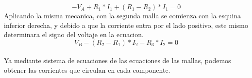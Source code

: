 \begin {equation*}
    -V_A + R_1 * I_1 + (R_1-R_2) * I_1 = 0
\end {equation*}
Aplicando la misma mecanica, con la segunda malla se comienza con la esquina inferior derecha, y debido a que la corriente entra por el lado positivo, este mismo determinara el signo del voltaje en la ecuacion. \\

\begin {equation*}
    V_B - (R_2 - R_1)*I_2 - R_3*I_2 = 0
\end {equation*}
\\
Ya mediante sistema de ecuaciones de las ecuaciones de las mallas, podemos obtener las corrientes que circulan en cada componente. 

